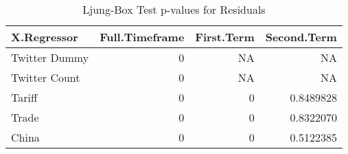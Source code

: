 \begin{table}

\caption{\label{tab:resterms table}Ljung-Box Test p-values for Residuals}
\centering
\begin{tabular}[t]{l|r|r|r}
\hline
X.Regressor & Full.Timeframe & First.Term & Second.Term\\
\hline
Twitter Dummy & 0 & NA & NA\\
\hline
Twitter Count & 0 & NA & NA\\
\hline
Tariff & 0 & 0 & 0.8489828\\
\hline
Trade & 0 & 0 & 0.8322070\\
\hline
China & 0 & 0 & 0.5122385\\
\hline
\end{tabular}
\end{table}
